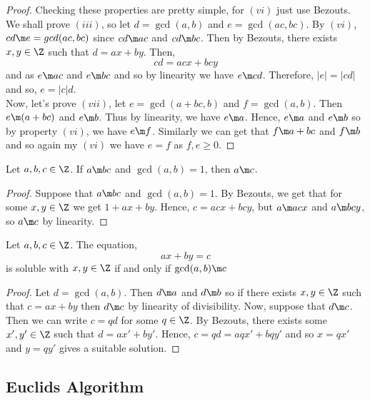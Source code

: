\begin{proof}
  Checking these properties are pretty simple, for $(vi)$ just use Bezouts. \\

  We shall prove $(iii)$, so let $d = \gcd(a, b)$ and $e = \gcd(ac, bc)$. By $(vi)$, $cd \m e = gcd(ac, bc)$ since $cd \m ac$ and $cd \m bc$. Then by Bezouts, there exists $x, y \in \Z$ such that $d = ax + by$. Then,
  $$ cd = acx + bcy $$
  and as $e \m ac$ and $e \m bc$ and so by linearity we have $e \m cd$. Therefore, $|e| = |cd|$ and so, $e = |c|d$.\\

  Now, let's prove $(vii)$, let $e = \gcd(a + bc, b)$ and $f = \gcd(a, b)$. Then $e \m (a + bc)$ and $e \m b$. Thus by linearity, we have $e \m a$. Hence, $e \m a$ and $e \m b$ so by property $(vi)$, we have $e \m f$. Similarly we can get that $f \m a + bc$ and $f \m b$ and so again my $(vi)$ we have $e = f$ as $f, e \ge 0$.
\end{proof}

\begin{nlemma}
  Let $a, b, c \in \Z$. If $a \m bc$ and $\gcd(a, b) = 1$, then $a \m c$.
\end{nlemma}

\begin{proof}
  Suppose that $a \m bc$ and $\gcd(a, b) = 1$. By Bezouts, we get that for some $x, y \in \Z$ we get $1 + ax + by$. Hence, $c = acx + bcy$, but $a \m acx$ and $a \m bcy$, so $a \m c$ by linearity.
\end{proof}

\begin{nthm}
  Let $a, b, c \in \Z$. The equation,
  $$ ax + by = c $$
  is soluble with $x, y \in \Z$ if and only if $\gcd(a, b) \m c$
\end{nthm}

\begin{proof}
  Let $d = \gcd(a, b)$. Then $d \m a$ and $d \m b$ so if there exists $x, y \in \Z$ such that $c = ax + by$ then $d \m c$ by linearity of divisibility. Now, suppose that $d \m c$. Then we can write $c = qd$ for some $q \in \Z$. By Bezouts, there exists some $x', y' \in \Z$ such that $d = ax' + by'$. Hence, $c = qd = aqx' + bqy'$ and so $x = qx'$ and $y = qy'$ gives a suitable solution.
\end{proof}

\subsection{Euclids Algorithm}

